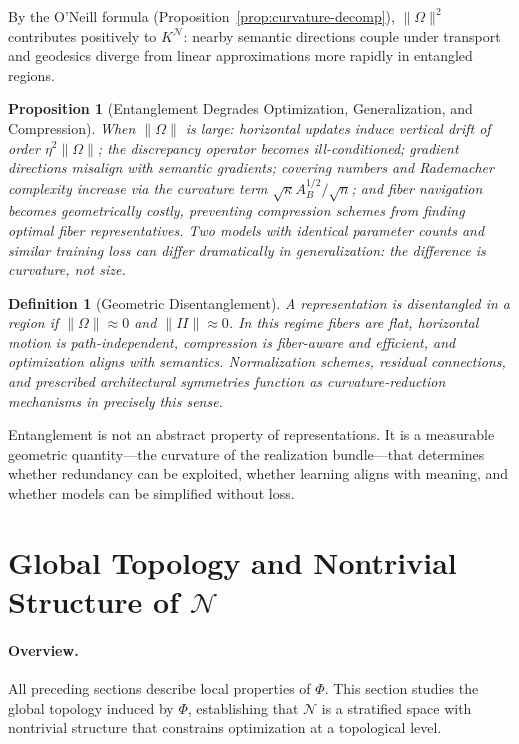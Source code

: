 \documentclass[twocolumn,10pt]{article}
\theoremstyle{thmstyle}
\newtheorem{proposition}[theorem]{Proposition}
\theoremstyle{defstyle}
\newtheorem{definition}[theorem]{Definition}
\begin{document}
By the O'Neill formula (Proposition~\ref{prop:curvature-decomp}),
$\|\Omega\|^2$ contributes positively to $K^\mathcal{N}$: nearby
semantic directions couple under transport and geodesics diverge from
linear approximations more rapidly in entangled regions.

\begin{proposition}[Entanglement Degrades Optimization, Generalization, and Compression]
When $\|\Omega\|$ is large: horizontal updates induce vertical drift
of order $\eta^2\|\Omega\|$; the discrepancy operator becomes
ill-conditioned; gradient directions misalign with semantic gradients;
covering numbers and Rademacher complexity increase via the curvature
term $\sqrt{\kappa}A_B^{1/2}/\sqrt{n}$; and fiber navigation becomes
geometrically costly, preventing compression schemes from finding
optimal fiber representatives.
Two models with identical parameter counts and similar training loss
can differ dramatically in generalization: the difference is curvature,
not size.
\end{proposition}

\begin{definition}[Geometric Disentanglement]
A representation is \emph{disentangled} in a region if
$\|\Omega\| \approx 0$ and $\|II\| \approx 0$. In this regime fibers
are flat, horizontal motion is path-independent, compression is
fiber-aware and efficient, and optimization aligns with semantics.
Normalization schemes, residual connections, and prescribed
architectural symmetries function as curvature-reduction mechanisms
in precisely this sense.
\end{definition}

Entanglement is not an abstract property of representations. It is a
measurable geometric quantity---the curvature of the realization
bundle---that determines whether redundancy can be exploited, whether
learning aligns with meaning, and whether models can be simplified
without loss.

\section{Global Topology and Nontrivial Structure of $\mathcal{N}$}
\label{sec:topology}

\paragraph{Overview.}
All preceding sections describe local properties of $\Phi$. This
section studies the global topology induced by $\Phi$, establishing
that $\mathcal{N}$ is a stratified space with nontrivial structure that
constrains optimization at a topological level.
\end{document}
